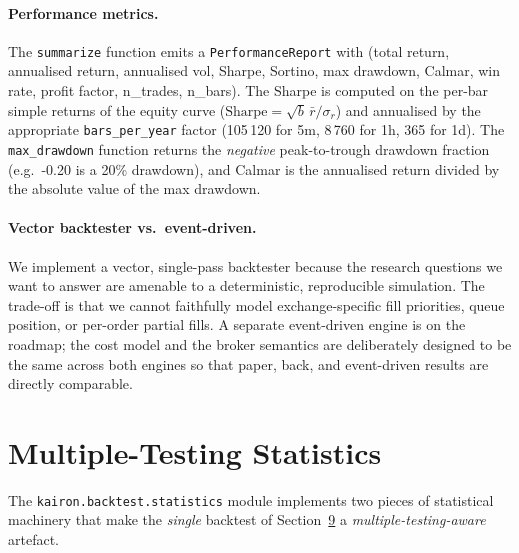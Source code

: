 \documentclass[11pt,a4paper]{article}
\let\oldsection\section
\renewcommand{\section}{\clearpage\oldsection}
\begin{document}
\paragraph{Performance metrics.}
The \texttt{summarize} function emits a
\texttt{PerformanceReport} with
(total return, annualised return, annualised vol,
Sharpe, Sortino, max drawdown, Calmar, win rate, profit
factor, n\_trades, n\_bars). The Sharpe is computed on the
per-bar simple returns of the equity curve
(\(\mathrm{Sharpe}=\sqrt{b}\,\bar{r}/\sigma_r\)) and
annualised by the appropriate \texttt{bars\_per\_year}
factor (105\,120 for 5m, 8\,760 for 1h, 365 for 1d).
The \texttt{max\_drawdown} function returns the
\emph{negative} peak-to-trough drawdown fraction (e.g.\ -0.20
is a 20\% drawdown), and Calmar is the annualised
return divided by the absolute value of the max drawdown.

\paragraph{Vector backtester vs.\ event-driven.}
We implement a vector, single-pass backtester because the
research questions we want to answer are amenable to a
deterministic, reproducible simulation. The trade-off is
that we cannot faithfully model exchange-specific fill
priorities, queue position, or per-order partial fills. A
separate event-driven engine is on the roadmap; the cost
model and the broker semantics are deliberately designed to
be the same across both engines so that paper, back, and
event-driven results are directly comparable.

\section{Multiple-Testing Statistics}\label{sec:stat}

The \texttt{kairon.backtest.statistics} module implements
two pieces of statistical machinery that make the
\emph{single} backtest of Section~\hyperref[sec:bt]{9} a
\emph{multiple-testing-aware} artefact.
\end{document}

